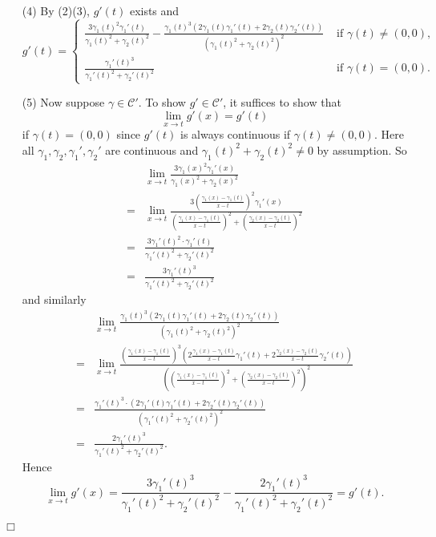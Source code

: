 \documentclass{article}
\begin{document}
\begin{enumerate}
\item[(4)]
By (2)(3), $g'(t)$ exists and
\begin{equation*}
  g'(t) =
    \begin{cases}
      \frac{3\gamma_1(t)^2\gamma_1'(t)}{\gamma_1(t)^2+\gamma_2(t)^2}
        - \frac{\gamma_1(t)^3(2\gamma_1(t)\gamma_1'(t)+2\gamma_2(t)\gamma_2'(t))}
          {(\gamma_1(t)^2+\gamma_2(t)^2)^2}
        & \text{ if $\gamma(t) \neq (0,0)$}, \\
      \frac{\gamma_1'(t)^3}{\gamma_1'(t)^2+\gamma_2'(t)^2}
        & \text{ if $\gamma(t) = (0,0)$}.
    \end{cases}
\end{equation*}

\item[(5)]
  Now suppose $\gamma \in \mathscr{C}'$.
  To show $g' \in \mathscr{C}'$, it suffices to show that
  \[
    \lim_{x \to t} g'(x) = g'(t)
  \]
  if $\gamma(t) = (0,0)$ since $g'(t)$ is always continuous if $\gamma(t) \neq (0,0)$.
  Here all $\gamma_1, \gamma_2, \gamma_1', \gamma_2'$ are continuous
  and $\gamma_1(t)^2+\gamma_2(t)^2 \neq 0$ by assumption.
  So
  \begin{align*}
    &\lim_{x \to t}
      \frac{3\gamma_1(x)^2\gamma_1'(x)}{\gamma_1(x)^2+\gamma_2(x)^2} \\
    =& \lim_{x \to t}
      \frac{3\left(\frac{\gamma_1(x)-\gamma_1(t)}{x-t}\right)^2\gamma_1'(x)}
      {\left(\frac{\gamma_1(x)-\gamma_1(t)}{x-t}\right)^2
        +\left(\frac{\gamma_2(x)-\gamma_2(t)}{x-t}\right)^2} \\
    =& \frac{3\gamma_1'(t)^2 \cdot \gamma_1'(t)}{\gamma_1'(t)^2+\gamma_2'(t)^2} \\
    =& \frac{3\gamma_1'(t)^3}{\gamma_1'(t)^2+\gamma_2'(t)^2}
  \end{align*}
  and similarly
  \begin{align*}
    &\lim_{x \to t}
      \frac{\gamma_1(t)^3(2\gamma_1(t)\gamma_1'(t)+2\gamma_2(t)\gamma_2'(t))}
        {(\gamma_1(t)^2+\gamma_2(t)^2)^2} \\
    =& \lim_{x \to t}
      \frac{\left(\frac{\gamma_1(x)-\gamma_1(t)}{x-t}\right)^3
        \left( 2\frac{\gamma_1(x)-\gamma_1(t)}{x-t}\gamma_1'(t)
        +2\frac{\gamma_2(x)-\gamma_2(t)}{x-t}\gamma_2'(t) \right)}
      {\left( \left(\frac{\gamma_1(x)-\gamma_1(t)}{x-t}\right)^2
        +\left(\frac{\gamma_2(x)-\gamma_2(t)}{x-t}\right)^2 \right)^2} \\
    =& \frac{\gamma_1'(t)^3 \cdot (2\gamma_1'(t)\gamma_1'(t) + 2\gamma_2'(t)\gamma_2'(t))}
      {(\gamma_1'(t)^2+\gamma_2'(t)^2)^2} \\
    =& \frac{2\gamma_1'(t)^3}{\gamma_1'(t)^2+\gamma_2'(t)^2}.
  \end{align*}
  Hence
  \[
    \lim_{x \to t} g'(x)
    = \frac{3\gamma_1'(t)^3}{\gamma_1'(t)^2+\gamma_2'(t)^2}
      - \frac{2\gamma_1'(t)^3}{\gamma_1'(t)^2+\gamma_2'(t)^2}
    = g'(t).
  \]

\end{enumerate}
$\Box$ \\
\end{document}
